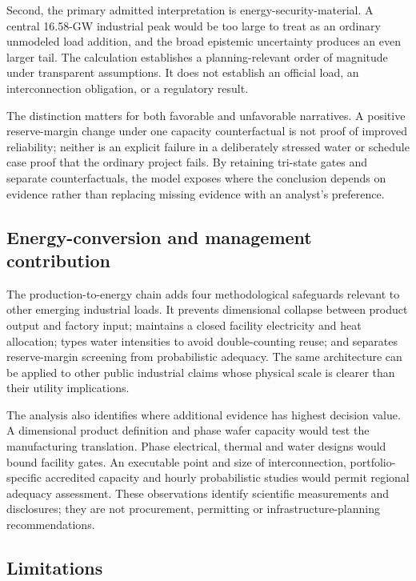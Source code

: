 \documentclass[11pt]{article}
\begin{document}
Second, the primary admitted interpretation is energy-security-material. A
central 16.58-GW industrial peak would be too large to treat as an ordinary
unmodeled load addition, and the broad epistemic uncertainty produces an even
larger tail. The calculation establishes a planning-relevant order of
magnitude under transparent assumptions. It does not establish an official
load, an interconnection obligation, or a regulatory result.

The distinction matters for both favorable and unfavorable narratives. A
positive reserve-margin change under one capacity counterfactual is not proof
of improved reliability; neither is an explicit failure in a deliberately
stressed water or schedule case proof that the ordinary project fails. By
retaining tri-state gates and separate counterfactuals, the model exposes where
the conclusion depends on evidence rather than replacing missing evidence with
an analyst's preference.

\subsection{Energy-conversion and management contribution}

The production-to-energy chain adds four methodological safeguards relevant to
other emerging industrial loads. It prevents dimensional collapse between
product output and factory input; maintains a closed facility electricity and
heat allocation; types water intensities to avoid double-counting reuse; and
separates reserve-margin screening from probabilistic adequacy. The same
architecture can be applied to other public industrial claims whose physical
scale is clearer than their utility implications.

The analysis also identifies where additional evidence has highest decision
value. A dimensional product definition and phase wafer capacity would test the
manufacturing translation. Phase electrical, thermal and water designs would
bound facility gates. An executable point and size of interconnection,
portfolio-specific accredited capacity and hourly probabilistic studies would
permit regional adequacy assessment. These observations identify scientific
measurements and disclosures; they are not procurement, permitting or
infrastructure-planning recommendations.

\subsection{Limitations}
\end{document}
